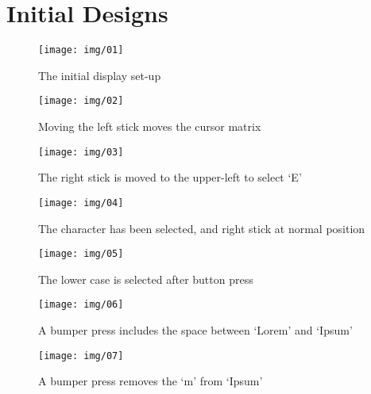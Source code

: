 \documentclass[requirements.tex]{subfiles}
\begin{document}
\section{Initial Designs} %
\label{sec:initial_designs}

\begin{figure}[H]
    \centering
    \texttt{[image: img/01]}
    \caption{The initial display set-up}
    \label{fig:initial}
\end{figure}

\begin{figure}[H]
    \centering
    \texttt{[image: img/02]}
    \caption{Moving the left stick moves the cursor matrix}
    \label{fig:matrix}
\end{figure}

\begin{figure}[H]
    \centering
    \texttt{[image: img/03]}
    \caption{The right stick is moved to the upper-left to select `E'}
    \label{fig:select}
\end{figure}

\begin{figure}[H]
    \centering
    \texttt{[image: img/04]}
    \caption{The character has been selected, and right stick at normal
    position}
    \label{fig:selected}
\end{figure}

\begin{figure}[H]
    \centering
    \texttt{[image: img/05]}
    \caption{The lower case is selected after button press}
    \label{fig:case}
\end{figure}

\begin{figure}[H]
    \centering
    \texttt{[image: img/06]}
    \caption{A bumper press includes the space between `Lorem' and `Ipsum'}
    \label{fig:space}
\end{figure}

\begin{figure}[H]
    \centering
    \texttt{[image: img/07]}
    \caption{A bumper press removes the `m' from `Ipsum'}
    \label{fig:backspace}
\end{figure}
\newpage
\end{document}
